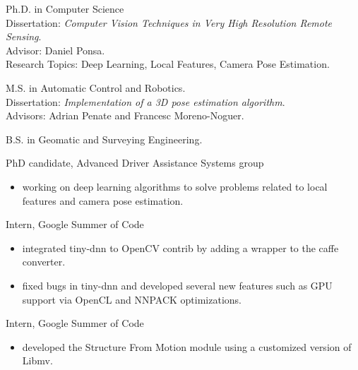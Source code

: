 \documentclass{article}
\begin{document}


\begin{llist}
\label{Education}

 
Ph.D. in Computer Science\\
Dissertation: \textit{Computer Vision Techniques in Very
High Resolution Remote Sensing}.\\
Advisor: Daniel Ponsa.\\
Research Topics: Deep Learning, Local Features, Camera Pose Estimation.

 
M.S. in Automatic Control and Robotics.\\
Dissertation: \textit{Implementation of a 3D pose estimation algorithm}.\\
Advisors: Adrian Penate and Francesc Moreno-Noguer.

 
B.S. in Geomatic and Surveying Engineering.


\label{Work Experience}
\vspace{-0.33cm}

PhD candidate, Advanced Driver Assistance Systems group
\vspace{-0.33cm}
\begin{itemize}
 \item working on deep learning algorithms to solve problems related to local features and camera pose estimation.
\end{itemize}

Intern, Google Summer of Code
\vspace{-0.33cm}
\begin{itemize}
 \item integrated tiny-dnn to OpenCV contrib by adding a wrapper to the caffe converter.
 \item fixed bugs in tiny-dnn and developed several new features such as GPU support via OpenCL and NNPACK optimizations.
\end{itemize}

Intern, Google Summer of Code
\vspace{-0.33cm}
\begin{itemize}
 \item developed the Structure From Motion module using a customized version of Libmv.
\end{itemize}


\end{llist}
\end{document}
